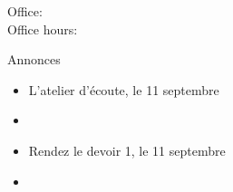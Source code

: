 \documentclass{beamer}
\subtitle[Activités]{Les activités, les verbes \lexi{-er} et la négation}
\begin{document}
  \begin{frame}
    \titlepage
    \tiny{Office: \\
          Office hours: }
  \end{frame}

  \begin{frame}{Annonces}
    \begin{itemize}
      \item L'atelier d'écoute, le 11 septembre
      \item[] 
      \item Rendez le devoir 1, le 11 septembre
      \item[] 
    \end{itemize}
  \end{frame}

\end{document}
